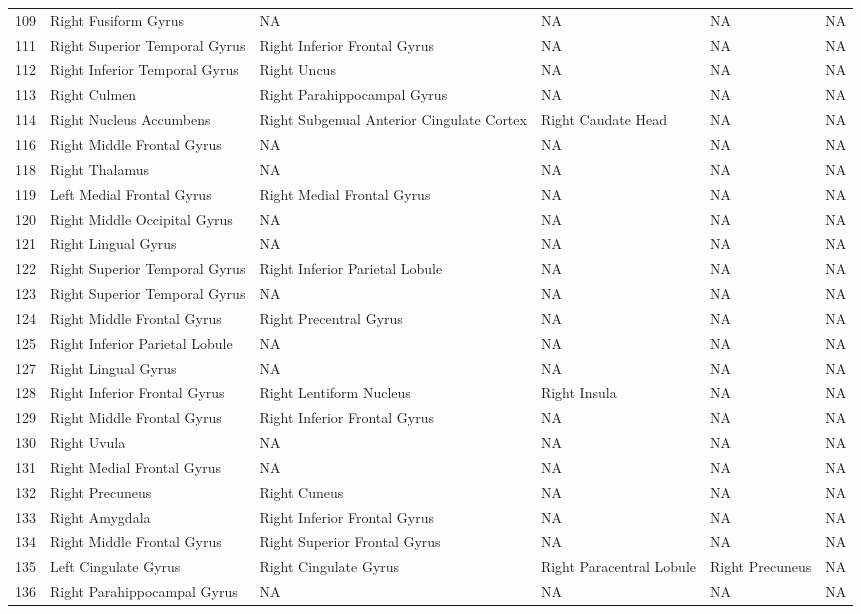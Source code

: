 \documentclass[10pt,letterpaper]{article}\usepackage[]{graphicx}\usepackage[]{color}
\begin{document}
\begin{center}
\begin{longtable}[c]{cP{1.1in}P{1.1in}P{1.1in}P{1.1in}P{1.1in}}
		109	& Right Fusiform Gyrus & NA	& NA & NA & NA \\
		111	& Right Superior Temporal Gyrus	& Right Inferior Frontal Gyrus & NA	& NA & NA \\
		112	& Right Inferior Temporal Gyrus	& Right Uncus & NA & NA	& NA \\
		113	& Right Culmen & Right Parahippocampal Gyrus & NA & NA & NA \\
		114	& Right Nucleus Accumbens & Right Subgenual Anterior Cingulate Cortex & Right Caudate Head	& NA & NA \\
		116 & Right Middle Frontal Gyrus & NA & NA & NA	& NA \\
		118	& Right Thalamus & NA & NA & NA	& NA \\
		119	& Left Medial Frontal Gyrus & Right Medial Frontal Gyrus & NA & NA & NA \\
		120	& Right Middle Occipital Gyrus & NA	& NA & NA & NA \\
		121	& Right Lingual Gyrus & NA & NA	& NA & NA \\
		122	& Right Superior Temporal Gyrus & Right Inferior Parietal Lobule & NA & NA & NA \\
		123	& Right Superior Temporal Gyrus	& NA & NA & NA & NA \\
		124	& Right Middle Frontal Gyrus & Right Precentral Gyrus & NA & NA	& NA \\
		125	& Right Inferior Parietal Lobule & NA & NA & NA	& NA \\
		127	& Right Lingual Gyrus & NA & NA	& NA & NA \\
		128	& Right Inferior Frontal Gyrus & Right Lentiform Nucleus & Right Insula	& NA & NA \\
		129	& Right Middle Frontal Gyrus & Right Inferior Frontal Gyrus	& NA & NA & NA \\
		130	& Right Uvula & NA & NA	& NA & NA \\
		131	& Right Medial Frontal Gyrus & NA & NA & NA	& NA \\
		132	& Right Precuneus & Right Cuneus & NA & NA & NA \\
		133	& Right Amygdala & Right Inferior Frontal Gyrus	& NA & NA & NA \\
		134	& Right Middle Frontal Gyrus & Right Superior Frontal Gyrus	& NA & NA & NA \\
		135	& Left Cingulate Gyrus & Right Cingulate Gyrus & Right Paracentral Lobule & Right Precuneus	& NA \\
		136	& Right Parahippocampal Gyrus & NA & NA	& NA & NA \\

\end{longtable}
\end{center}
\end{document}

